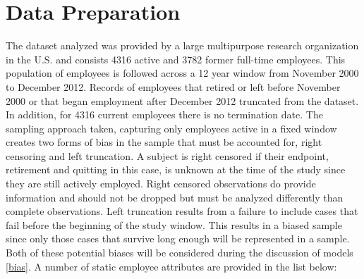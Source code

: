 \documentclass[12pt,letterpaper]{article}
\begin{document}
\section{Data Preparation}\label{data.desc}
The dataset analyzed was provided by a large multipurpose research organization in the U.S. and consists 4316 active and 3782 former full-time employees.  This population of employees is followed across a 12 year window from November 2000 to December 2012.  Records of employees that retired or left before November 2000 or that began employment after December 2012 truncated from the dataset. In addition, for 4316 current employees there is no termination date. The sampling approach taken, capturing only employees active in a fixed window creates two forms of bias in the sample that must be accounted for, right censoring and left truncation. A subject is right censored if their endpoint, retirement and quitting in this case, is unknown at the time of the study since they are still actively employed.  Right censored observations do provide information and should not be dropped but must be analyzed differently than complete observations.   Left truncation results from a failure to include cases that fail before the beginning of the study window.  This results in a biased sample since only those cases that survive long enough will be represented in a sample.  Both of these potential biases will be considered during the discussion of models \ref{bias}.
A number of static employee attributes are provided in the list below:
\end{document}
